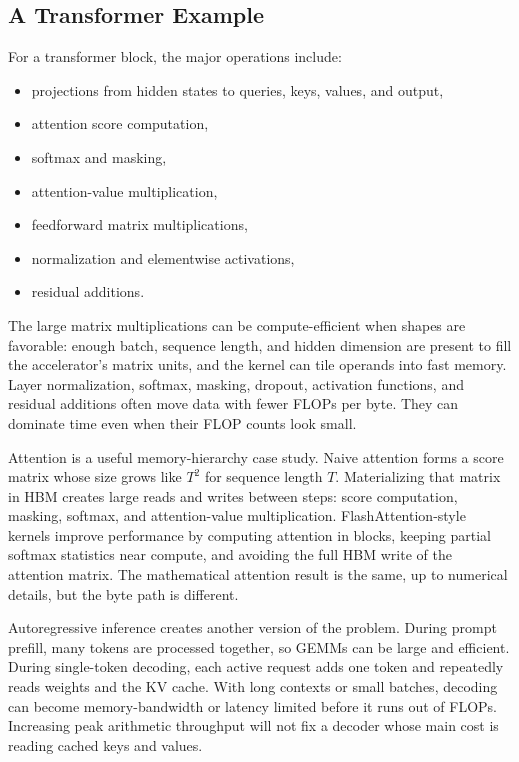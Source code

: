 \subsection{A Transformer Example}

For a transformer block, the major operations include:

\begin{itemize}[leftmargin=*]
  \item projections from hidden states to queries, keys, values, and output,
  \item attention score computation,
  \item softmax and masking,
  \item attention-value multiplication,
  \item feedforward matrix multiplications,
  \item normalization and elementwise activations,
  \item residual additions.
\end{itemize}

The large matrix multiplications can be compute-efficient when shapes are favorable: enough batch, sequence length, and hidden dimension are present to fill the accelerator's matrix units, and the kernel can tile operands into fast memory. Layer normalization, softmax, masking, dropout, activation functions, and residual additions often move data with fewer FLOPs per byte. They can dominate time even when their FLOP counts look small.

Attention is a useful memory-hierarchy case study. Naive attention forms a score matrix whose size grows like \(T^2\) for sequence length \(T\). Materializing that matrix in HBM creates large reads and writes between steps: score computation, masking, softmax, and attention-value multiplication. FlashAttention-style kernels improve performance by computing attention in blocks, keeping partial softmax statistics near compute, and avoiding the full HBM write of the attention matrix. The mathematical attention result is the same, up to numerical details, but the byte path is different.

Autoregressive inference creates another version of the problem. During prompt prefill, many tokens are processed together, so GEMMs can be large and efficient. During single-token decoding, each active request adds one token and repeatedly reads weights and the KV cache. With long contexts or small batches, decoding can become memory-bandwidth or latency limited before it runs out of FLOPs. Increasing peak arithmetic throughput will not fix a decoder whose main cost is reading cached keys and values.

